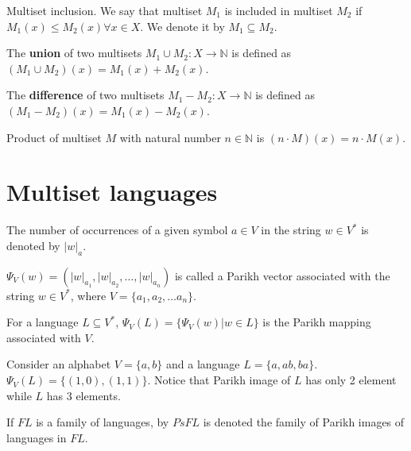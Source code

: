\begin{definition}
Multiset inclusion. We say that multiset $M_1$ is included in multiset $M_2$ if $M_1(x)\leq M_2(x)\forall x \in X$. We denote it by $M_1\subseteq M_2$.
\end{definition}

\begin{definition}
The {\bf union} of two multisets $M_1\cup M_2 : X\rightarrow \mathbb N$ is defined as $(M_1\cup M_2)(x)=M_1(x)+M_2(x)$.
\end{definition}

\begin{definition}
The {\bf difference} of two multisets $M_1-M_2 : X\rightarrow \mathbb N$ is defined as $(M_1-M_2)(x)=M_1(x)-M_2(x)$.
\end{definition}

\begin{definition}
Product of multiset $M$ with natural number $n\in \mathbb N$ is $(n\cdot M)(x)=n\cdot M(x)$.  
\end{definition}


\section{Multiset languages} %
\label{sec:multiset_languages}

The number of occurrences of a given symbol $a\in V$ in the string $w\in V^*$ is denoted by $|w|_a$.

\begin{definition}
$\Psi_V(w)=(|w|_{a_1},|w|_{a_2},\dots,|w|_{a_n})$ is called a Parikh vector associated with the string $w\in V^*$, where $V=\{a_1,a_2,\dots a_n\}$.
\end{definition}

\begin{definition}
For a language $L\subseteq V^*$, $\Psi_V(L)=\{\Psi_V(w)|w\in L\}$ is the Parikh mapping associated with $V$.
\end{definition}

\begin{example}
Consider an alphabet $V=\{a,b\}$ and a language $L=\{a, ab, ba\}$.
$\Psi_V(L)=\{(1,0), (1,1)\}$. Notice that Parikh image of $L$ has only 2 element while $L$ has 3 elements.
\end{example}

\begin{definition}
If $FL$ is a family of languages, by $PsFL$ is denoted the family of Parikh images of languages in $FL$.
\end{definition}

